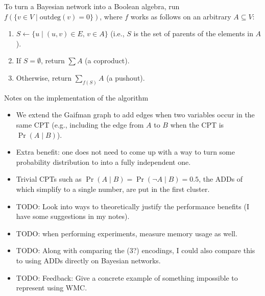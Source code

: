 \documentclass{article}
\theoremstyle{definition}
\theoremstyle{remark}
\begin{document}
To turn a Bayesian network into a Boolean algebra, run $f(\{ v \in V \mid
\mathrm{outdeg}(v) = 0 \})$, where $f$ works as follows on an arbitrary $A
\subseteq V$:
\begin{enumerate}
\item $S \gets \{ u \mid (u, v) \in E\text{, } v \in A \}$ (i.e., $S$ is the set
  of parents of the elements in $A$).
\item If $S = \emptyset$, return $\sum A$ (a coproduct).
\item Otherwise, return $\sum_{f(S)} A$ (a pushout).
\end{enumerate}

Notes on the implementation of the algorithm
\begin{itemize}
\item We extend the Gaifman graph to add edges when two variables occur in the
  same CPT (e.g., including the edge from $A$ to $B$ when the CPT is $\Pr(A \mid
  B)$).
\item Extra benefit: one does not need to come up with a way to turn some probability
distribution to into a fully independent one.
\item Trivial CPTs such as $\Pr(A \mid B) = \Pr(\neg A \mid B) = 0.5$, the ADDs
  of which simplify to a single number, are put in the first cluster.
\item TODO: Look into ways to theoretically justify the performance benefits (I
  have some suggestions in my notes).
\item TODO: when performing experiments, measure memory usage as well.
\item TODO: Along with comparing the (3?) encodings, I could also compare this
  to using ADDs directly on Bayesian networks.
\item TODO: Feedback: Give a concrete example of something impossible to
  represent using WMC.
\end{itemize}



\end{document}
